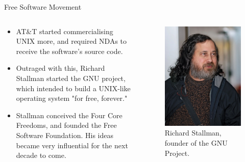 \documentclass[9pt, dvipsnames]{beamer}
\begin{document}
\begin{frame}{Free Software Movement}
    \begin{columns}
        \begin{column}{0.5\textwidth}
            \begin{itemize}
                \item AT\&T started commercialising UNIX more, and required NDAs
                to receive the software's source code.
                \item Outraged with this, Richard Stallman started the GNU
                project, which intended to build a UNIX-like operating system
                "for free, forever."
                \item Stallman conceived the Four Core Freedoms, and founded the
                Free Software Foundation. His ideas became very influential for
                the next decade to come.
            \end{itemize}
        \end{column}
        \begin{column}{0.5\textwidth}
            \begin{figure}
                \centering
                \includegraphics[width=0.6\linewidth]{assets/stallman.jpg}
                \caption{Richard Stallman, founder of the GNU Project.}
            \end{figure}
        \end{column}
    \end{columns}
\end{frame}
\end{document}
